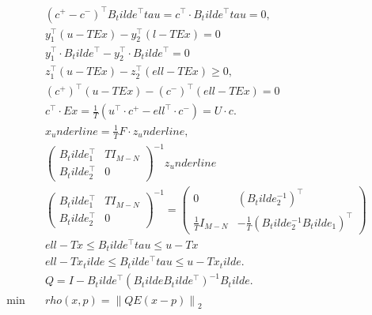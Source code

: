 \begin{align}
  & \left(\right. c^{+} - c^{-} \left.\right)^{\top} B_tilde^{\top} \mathit{tau} = c^{\top} \cdot B_tilde^{\top} \mathit{tau} = 0 , \tag{eq\_0025} \\
  & y_{1}^{\top} \left(u - \mathit{TEx}\right) - y_{2}^{\top} \left(l - \mathit{TEx}\right) = 0 \tag{eq\_0026\_a} \\
  & y_{1}^{\top} \cdot B_tilde^{\top} - y_{2}^{\top} \cdot B_tilde^{\top} = 0 \tag{eq\_0026\_b} \\
  & z_{1}^{\top} \left(u - \mathit{TEx}\right) - z_{2}^{\top} \left(\mathit{ell} - \mathit{TEx}\right) \geq 0 , \tag{eq\_0028} \\
  & \left(\right. c^{+} \left.\right)^{\top} \left(u - \mathit{TEx}\right) - \left(\right. c^{-} \left.\right)^{\top} \left(\mathit{ell} - \mathit{TEx}\right) = 0 \tag{eq\_0029} \\
  & c^{\top} \cdot \mathit{Ex} = \frac{1}{T} \left(u^{\top} \cdot c^{+} - \mathit{ell}^{\top} \cdot c^{-}\right) = U \cdot c . \tag{eq\_0030} \\
  & x_underline = \frac{1}{T} F \cdot z_underline , \tag{eq\_0042} \\
  & \begin{pmatrix} B_tilde_{1}^{\top} & \mathit{TI}_{M - N} \\ B_tilde_{2}^{\top} & 0 \end{pmatrix}^{- 1} z_underline \tag{eq\_0044} \\
  & \begin{pmatrix} B_tilde_{1}^{\top} & \mathit{TI}_{M - N} \\ B_tilde_{2}^{\top} & 0 \end{pmatrix}^{- 1} = \begin{pmatrix} 0 & \left(B_tilde_{2}^{- 1}\right)^{\top} \\ \frac{1}{T} I_{M - N} & - \frac{1}{T} \left(B_tilde_{2}^{- 1} B_tilde_{1}\right)^{\top} \end{pmatrix} \tag{eq\_0045} \\
  & \mathit{ell} - \mathit{Tx} \leq B_tilde^{\top} \mathit{tau} \leq u - \mathit{Tx} \tag{eq\_0046} \\
  & \mathit{ell} - \mathit{Tx}_tilde \leq B_tilde^{\top} \mathit{tau} \leq u - \mathit{Tx}_tilde . \tag{eq\_0047} \\
  & Q = I - B_tilde^{\top} \left(\right. B_tilde B_tilde^{\top} \left.\right)^{- 1} B_tilde . \tag{eq\_0050} \\
  \min\quad & \mathit{rho} \left(x , p\right) = \left\|\mathit{QE} \left(x - p\right)\right\|_{2} \tag{eq\_0051\_a} \\

\end{align}
